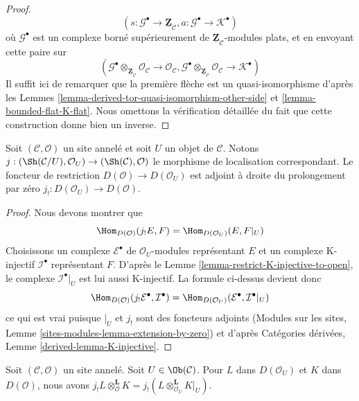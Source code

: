 \begin{proof}
$$
(s : \mathcal{G}^\bullet \to \underline{\mathbf{Z}}_\mathcal{C},
a : \mathcal{G}^\bullet \to \mathcal{K}^\bullet)
$$
où $\mathcal{G}^\bullet$ est un complexe borné supérieurement de
$\underline{\mathbf{Z}}_\mathcal{C}$-modules plats, et en envoyant cette
paire sur
$$
(\mathcal{G}^\bullet \otimes_{\underline{\mathbf{Z}}_\mathcal{C}}
\mathcal{O}_\mathcal{C}
\to \mathcal{O}_\mathcal{C},
\mathcal{G}^\bullet  \otimes_{\underline{\mathbf{Z}}_\mathcal{C}}
\mathcal{O}_\mathcal{C}
\to \mathcal{K}^\bullet)
$$
Il suffit ici de remarquer que la première flèche est un
quasi-isomorphisme d'après les Lemmes
\ref{lemma-derived-tor-quasi-isomorphism-other-side} et
\ref{lemma-bounded-flat-K-flat}. Nous omettons la vérification détaillée du
fait que cette construction donne bien un inverse.
\end{proof}

\begin{lemma}
\label{lemma-adjoint-lower-shriek-restrict}
Soit $(\mathcal{C}, \mathcal{O})$ un site annelé et soit $U$ un objet de
$\mathcal{C}$. Notons
$j : (\Sh(\mathcal{C}/U), \mathcal{O}_U) \to (\Sh(\mathcal{C}), \mathcal{O})$
le morphisme de localisation correspondant. Le foncteur de restriction
$D(\mathcal{O}) \to D(\mathcal{O}_U)$ est adjoint à droite du prolongement
par zéro $j_! : D(\mathcal{O}_U) \to D(\mathcal{O})$.
\end{lemma}

\begin{proof}
Nous devons montrer que
$$
\Hom_{D(\mathcal{O})}(j_!E, F) = \Hom_{D(\mathcal{O}_U)}(E, F|_U)
$$
Choisissons un complexe $\mathcal{E}^\bullet$ de $\mathcal{O}_U$-modules
représentant $E$ et un complexe K-injectif $\mathcal{I}^\bullet$
représentant $F$. D'après le Lemme
\ref{lemma-restrict-K-injective-to-open}, le complexe
$\mathcal{I}^\bullet|_U$ est lui aussi K-injectif. La formule ci-dessus
devient donc
$$
\Hom_{D(\mathcal{O})}(j_!\mathcal{E}^\bullet, \mathcal{I}^\bullet) =
\Hom_{D(\mathcal{O}_U)}(\mathcal{E}^\bullet, \mathcal{I}^\bullet|_U)
$$
ce qui est vrai puisque $|_U$ et $j_!$ sont des foncteurs adjoints
(Modules sur les sites, Lemme
\ref{sites-modules-lemma-extension-by-zero}) et d'après Catégories dérivées,
Lemme \ref{derived-lemma-K-injective}.
\end{proof}

\begin{lemma}
\label{lemma-j-shriek-and-tensor}
Soit $(\mathcal{C}, \mathcal{O})$ un site annelé. Soit
$U \in \Ob(\mathcal{C})$. Pour $L$ dans $D(\mathcal{O}_U)$ et $K$ dans
$D(\mathcal{O})$, nous avons
$j_!L \otimes_\mathcal{O}^\mathbf{L} K =
j_!(L \otimes_{\mathcal{O}_U}^\mathbf{L} K|_U)$.
\end{lemma}

